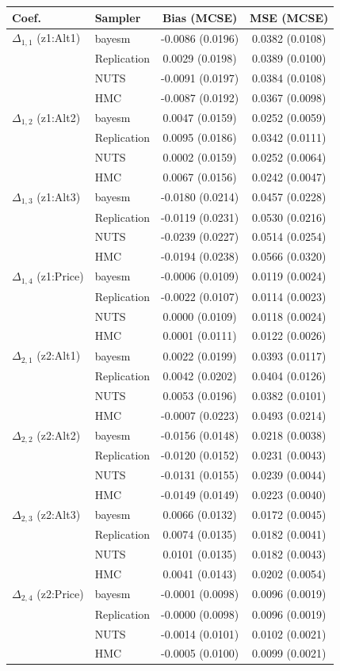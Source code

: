 \begin{tabular}{llcc}
\toprule
Coef. & Sampler & Bias (MCSE) & MSE (MCSE) \\
\midrule
$\Delta_{1,1}$ (z1:Alt1) & bayesm & -0.0086 (0.0196) & 0.0382 (0.0108) \\
 & Replication & 0.0029 (0.0198) & 0.0389 (0.0100) \\
 & NUTS & -0.0091 (0.0197) & 0.0384 (0.0108) \\
 & HMC & -0.0087 (0.0192) & 0.0367 (0.0098) \\
$\Delta_{1,2}$ (z1:Alt2) & bayesm & 0.0047 (0.0159) & 0.0252 (0.0059) \\
 & Replication & 0.0095 (0.0186) & 0.0342 (0.0111) \\
 & NUTS & 0.0002 (0.0159) & 0.0252 (0.0064) \\
 & HMC & 0.0067 (0.0156) & 0.0242 (0.0047) \\
$\Delta_{1,3}$ (z1:Alt3) & bayesm & -0.0180 (0.0214) & 0.0457 (0.0228) \\
 & Replication & -0.0119 (0.0231) & 0.0530 (0.0216) \\
 & NUTS & -0.0239 (0.0227) & 0.0514 (0.0254) \\
 & HMC & -0.0194 (0.0238) & 0.0566 (0.0320) \\
$\Delta_{1,4}$ (z1:Price) & bayesm & -0.0006 (0.0109) & 0.0119 (0.0024) \\
 & Replication & -0.0022 (0.0107) & 0.0114 (0.0023) \\
 & NUTS & 0.0000 (0.0109) & 0.0118 (0.0024) \\
 & HMC & 0.0001 (0.0111) & 0.0122 (0.0026) \\
$\Delta_{2,1}$ (z2:Alt1) & bayesm & 0.0022 (0.0199) & 0.0393 (0.0117) \\
 & Replication & 0.0042 (0.0202) & 0.0404 (0.0126) \\
 & NUTS & 0.0053 (0.0196) & 0.0382 (0.0101) \\
 & HMC & -0.0007 (0.0223) & 0.0493 (0.0214) \\
$\Delta_{2,2}$ (z2:Alt2) & bayesm & -0.0156 (0.0148) & 0.0218 (0.0038) \\
 & Replication & -0.0120 (0.0152) & 0.0231 (0.0043) \\
 & NUTS & -0.0131 (0.0155) & 0.0239 (0.0044) \\
 & HMC & -0.0149 (0.0149) & 0.0223 (0.0040) \\
$\Delta_{2,3}$ (z2:Alt3) & bayesm & 0.0066 (0.0132) & 0.0172 (0.0045) \\
 & Replication & 0.0074 (0.0135) & 0.0182 (0.0041) \\
 & NUTS & 0.0101 (0.0135) & 0.0182 (0.0043) \\
 & HMC & 0.0041 (0.0143) & 0.0202 (0.0054) \\
$\Delta_{2,4}$ (z2:Price) & bayesm & -0.0001 (0.0098) & 0.0096 (0.0019) \\
 & Replication & -0.0000 (0.0098) & 0.0096 (0.0019) \\
 & NUTS & -0.0014 (0.0101) & 0.0102 (0.0021) \\
 & HMC & -0.0005 (0.0100) & 0.0099 (0.0021) \\
\bottomrule
\end{tabular}
